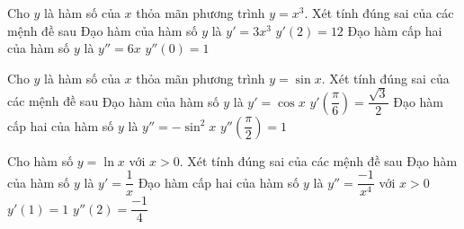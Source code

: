 \begin{ex}%
 Cho $y$ là hàm số của $x$ thỏa mãn phương trình $y=x^3$. Xét tính  đúng sai của các mệnh đề sau
  \choiceTF
  {Đạo hàm của hàm số $y$ là  $y'=3x^3$}
  {\True $y'(2)=12$} 
  {\True Đạo hàm cấp hai của hàm số $y$  là $y''=6x$}
   {$y''(0)=1$}
\end{ex}

\begin{ex}%
 Cho $y$ là hàm số  của $x$ thỏa mãn phương trình $y=\sin x$. Xét tính đúng sai của các mệnh đề sau
 \choiceTF 
   {\True Đạo hàm của hàm số $y$ là $y'=\cos x$}
   {\True $y'\left(\dfrac{\pi}{6}\right)=\dfrac{\sqrt{3}}{2}$}
  {Đạo hàm cấp hai của hàm  số $y$ là $y''=-\sin^2x$}
   {$y''\left(\dfrac{\pi}{2}\right)=1$}
\end{ex}

\begin{ex}%
 Cho hàm số $y=\ln  x$ với $x>0$. Xét tính đúng sai của các mệnh đề sau
 \choiceTF 
  {\True Đạo hàm của  hàm số $y$ là $y'=\dfrac{1}{x}$}
   {Đạo hàm cấp hai của hàm số $y$ là $y''=\dfrac{-1}{x^4}$ với $x>0$}
   {\True $y'(1)=1$}
  {$y''(2)=\dfrac{-1}{4}$} 
\end{ex}

